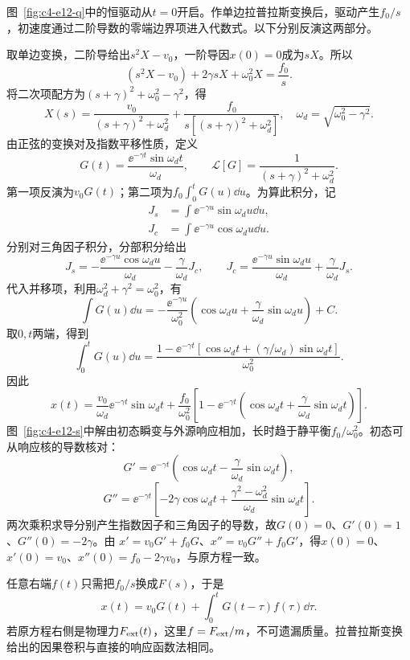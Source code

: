 \begin{solution}
图~\ref{fig:c4-e12-q}中的恒驱动从$t=0$开启。作单边拉普拉斯变换后，驱动产生$f_0/s$，初速度通过二阶导数的零端边界项进入代数式。以下分别反演这两部分。


取单边变换，二阶导给出$s^2X-v_0$，一阶导因$x(0)=0$成为$sX$。所以
\[(s^2X-v_0)+2\gamma sX+\omega_0^2X=\frac{f_0}{s}.\]
将二次项配方为$(s+\gamma)^2+\omega_0^2-\gamma^2$，得
\[X(s)=\frac{v_0}{(s+\gamma)^2+\omega_d^2}
+\frac{f_0}{s[(s+\gamma)^2+\omega_d^2]},\quad\omega_d=\sqrt{\omega_0^2-\gamma^2}.
\]
由正弦的变换对及指数平移性质，定义
\[G(t)=\frac{\ee^{-\gamma t}\sin\omega_dt}{\omega_d},\qquad
\mathcal L[G]=\frac1{(s+\gamma)^2+\omega_d^2}.\]
第一项反演为$v_0G(t)$；第二项为$f_0\int_0^tG(u)\dd u$。为算此积分，记
\begin{align*}
J_s&=\int\ee^{-\gamma u}\sin\omega_du\dd u,\\
J_c&=\int\ee^{-\gamma u}\cos\omega_du\dd u.
\end{align*}
分别对三角因子积分，分部积分给出
\[J_s=-\frac{\ee^{-\gamma u}\cos\omega_du}{\omega_d}
-\frac\gamma{\omega_d}J_c,\qquad
J_c=\frac{\ee^{-\gamma u}\sin\omega_du}{\omega_d}
+\frac\gamma{\omega_d}J_s.\]
代入并移项，利用$\omega_d^2+\gamma^2=\omega_0^2$，有
\[\int G(u)\dd u
=-\frac{\ee^{-\gamma u}}{\omega_0^2}
\left(\cos\omega_du+\frac\gamma{\omega_d}\sin\omega_du\right)+C.\]
取$0,t$两端，得到
\[\int_0^tG(u)\dd u=\frac{1-\ee^{-\gamma t}[\cos\omega_dt+(\gamma/\omega_d)\sin\omega_dt]}{\omega_0^2}.\]
因此
\[\boxed{x(t)=\frac{v_0}{\omega_d}\ee^{-\gamma t}\sin\omega_dt
+\frac{f_0}{\omega_0^2}\left[1-\ee^{-\gamma t}\left(\cos\omega_dt+\frac\gamma{\omega_d}\sin\omega_dt\right)\right]}.
\]
图~\ref{fig:c4-e12-s}中解由初态瞬变与外源响应相加，长时趋于静平衡$f_0/\omega_0^2$。初态可从响应核的导数核对：
\[G'=\ee^{-\gamma t}\left(\cos\omega_dt-\frac\gamma{\omega_d}\sin\omega_dt\right),\]
\[G''=\ee^{-\gamma t}\left[-2\gamma\cos\omega_dt
+\frac{\gamma^2-\omega_d^2}{\omega_d}\sin\omega_dt\right].\]
两次乘积求导分别产生指数因子和三角因子的导数，故$G(0)=0$、$G'(0)=1$、$G''(0)=-2\gamma$。由
$x'=v_0G'+f_0G$、$x''=v_0G''+f_0G'$，得$x(0)=0$、$x'(0)=v_0$、$x''(0)=f_0-2\gamma v_0$，与原方程一致。

任意右端$f(t)$只需把$f_0/s$换成$F(s)$，于是
\[x(t)=v_0G(t)+\int_0^tG(t-\tau)f(\tau)\dd\tau.
\]
若原方程右侧是物理力$F_{\rm ext}(t)$，这里$f=F_{\rm ext}/m$，不可遗漏质量。拉普拉斯变换给出的因果卷积与直接的响应函数法相同。




\end{solution}
